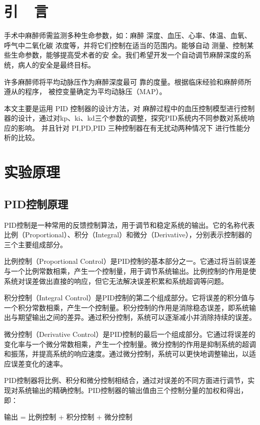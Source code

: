 \documentclass{thuemp}
\begin{document}
\section{引~~言}
\enlargethispage{-3.3cm}
手术中麻醉师需监测多种生命参数，如：麻醉
深度、血压、心率、体温、血氧、呼气中二氧化碳
浓度等，并将它们控制在适当的范围内。能够自动
测量、控制某些生命参数，能够提高受术者的安
全。我们希望开发一个自动调节麻醉深度的系
统，病人的安全是最终目标。

许多麻醉师将平均动脉压作为麻醉深度最可
靠的度量。根据临床经验和麻醉师所遵从的程序，
被控变量确定为平均动脉压（MAP）。

本文主要是运用 PID 控制器的设计方法，对
麻醉过程中的血压控制模型进行控制器的设计，通过对kp、ki、kd三个参数的调整，探究PID系统内不同参数对系统响应的影响。
并且针对 PI,PD,PID 三种控制器在有无扰动两种情况下
进行性能分析的比较。

\section{实验原理}


\subsection{PID控制原理}

PID控制是一种常用的反馈控制算法，用于调节和稳定系统的输出。它的名称代表比例（Proportional）、积分（Integral）和微分（Derivative），分别表示控制器的三个主要组成部分。

比例控制（Proportional Control）是PID控制的基本部分之一。它通过将当前误差与一个比例常数相乘，产生一个控制量，用于调节系统输出。比例控制的作用是使系统对误差做出直接的响应，但它无法解决误差积累和系统超调等问题。

积分控制（Integral Control）是PID控制的第二个组成部分。它将误差的积分值与一个积分常数相乘，产生一个控制量。积分控制的作用是消除稳态误差，即系统输出与期望输出之间的差异。通过积分控制，系统可以逐渐减小并消除持续的误差。

微分控制（Derivative Control）是PID控制的最后一个组成部分。它通过将误差的变化率与一个微分常数相乘，产生一个控制量。微分控制的作用是抑制系统的超调和振荡，并提高系统的响应速度。通过微分控制，系统可以更快地调整输出，以适应误差变化的速率。

PID控制器将比例、积分和微分控制相结合，通过对误差的不同方面进行调节，实现对系统输出的精确控制。PID控制器的输出值由三个控制分量的加权和得出，即：

输出 = 比例控制 + 积分控制 + 微分控制
\end{document}
